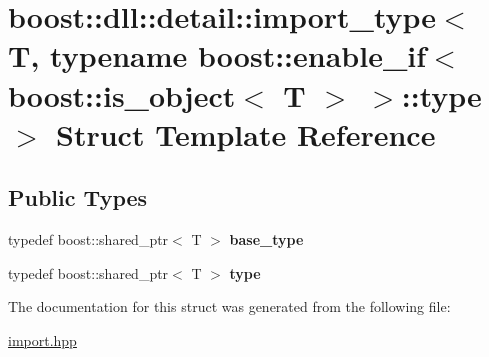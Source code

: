 \hypertarget{a00154}{}\section{boost\+:\+:dll\+:\+:detail\+:\+:import\+\_\+type$<$ T, typename boost\+:\+:enable\+\_\+if$<$ boost\+:\+:is\+\_\+object$<$ T $>$ $>$\+:\+:type $>$ Struct Template Reference}
\label{a00154}
\subsection*{Public Types}
\begin{DoxyCompactItemize}
\item 
typedef boost\+::shared\+\_\+ptr$<$ T $>$ {\bfseries base\+\_\+type}\hypertarget{a00154_add0253b94384ed45c179b8cac9483401}{}\label{a00154_add0253b94384ed45c179b8cac9483401}

\item 
typedef boost\+::shared\+\_\+ptr$<$ T $>$ {\bfseries type}\hypertarget{a00154_abfa036f322955328a8fe74db901065ba}{}\label{a00154_abfa036f322955328a8fe74db901065ba}

\end{DoxyCompactItemize}


The documentation for this struct was generated from the following file\+:\begin{DoxyCompactItemize}
\item 
\hyperlink{a00570}{import.\+hpp}\end{DoxyCompactItemize}
